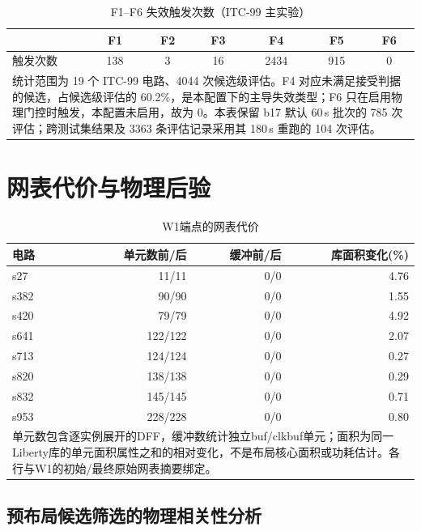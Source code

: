 \documentclass[twocolumn,10pt,fontset=windows]{ctexart}
\begin{document}
\begin{table}[!htb]
\centering
\caption{F1--F6 失效触发次数（ITC-99 主实验）}
\label{tab:f16_dist}
\scriptsize
\setlength{\tabcolsep}{3pt}
\begin{tabular}{lcccccc}
\toprule
 & \textbf{F1} & \textbf{F2} & \textbf{F3} & \textbf{F4} & \textbf{F5} & \textbf{F6} \\
\midrule
触发次数 & 138 & 3 & 16 & 2434 & 915 & 0 \\
\bottomrule
\multicolumn{7}{p{0.95\columnwidth}}{\footnotesize 统计范围为 19 个 ITC-99 电路、4044 次候选级评估。F4 对应未满足接受判据的候选，占候选级评估的 60.2\%，是本配置下的主导失效类型；F6 只在启用物理门控时触发，本配置未启用，故为 0。本表保留 b17 默认 60\,s 批次的 785 次评估；跨测试集结果及 3363 条评估记录采用其 180\,s 重跑的 104 次评估。} \\
\end{tabular}
\end{table}

\section{网表代价与物理后验}
\begin{table}[htbp]
\centering\caption{W1端点的网表代价}\label{tab:netlist_cost}
\footnotesize\setlength{\tabcolsep}{3pt}
\begin{tabular}{lrrr}
\toprule
\textbf{电路} & \textbf{单元数前/后} & \textbf{缓冲前/后} & \textbf{库面积变化(\%)}\\
\midrule
s27 & 11/11 & 0/0 & 4.76 \\
s382 & 90/90 & 0/0 & 1.55 \\
s420 & 79/79 & 0/0 & 4.92 \\
s641 & 122/122 & 0/0 & 2.07 \\
s713 & 124/124 & 0/0 & 0.27 \\
s820 & 138/138 & 0/0 & 0.29 \\
s832 & 145/145 & 0/0 & 0.71 \\
s953 & 228/228 & 0/0 & 0.80 \\
\bottomrule
\multicolumn{4}{p{0.93\columnwidth}}{\footnotesize 单元数包含逐实例展开的DFF，缓冲数统计独立buf/clkbuf单元；面积为同一Liberty库的单元面积属性之和的相对变化，不是布局核心面积或功耗估计。各行与W1的初始/最终原始网表摘要绑定。}\\
\end{tabular}
\end{table}
\subsection{预布局候选筛选的物理相关性分析}\label{sec:phys_closure}
\end{document}

